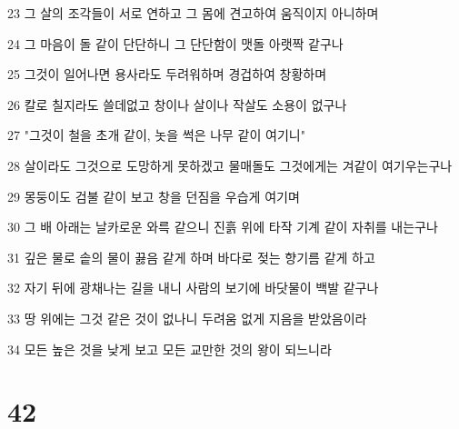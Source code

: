 \par 23 그 살의 조각들이 서로 연하고 그 몸에 견고하여 움직이지 아니하며
\par 24 그 마음이 돌 같이 단단하니 그 단단함이 맷돌 아랫짝 같구나
\par 25 그것이 일어나면 용사라도 두려워하며 경겁하여 창황하며
\par 26 칼로 칠지라도 쓸데없고 창이나 살이나 작살도 소용이 없구나
\par 27 "그것이 철을 초개 같이, 놋을 썩은 나무 같이 여기니"
\par 28 살이라도 그것으로 도망하게 못하겠고 물매돌도 그것에게는 겨같이 여기우는구나
\par 29 몽둥이도 검불 같이 보고 창을 던짐을 우습게 여기며
\par 30 그 배 아래는 날카로운 와륵 같으니 진흙 위에 타작 기계 같이 자취를 내는구나
\par 31 깊은 물로 솥의 물이 끓음 같게 하며 바다로 젖는 향기름 같게 하고
\par 32 자기 뒤에 광채나는 길을 내니 사람의 보기에 바닷물이 백발 같구나
\par 33 땅 위에는 그것 같은 것이 없나니 두려움 없게 지음을 받았음이라
\par 34 모든 높은 것을 낮게 보고 모든 교만한 것의 왕이 되느니라

\chapter{42}

